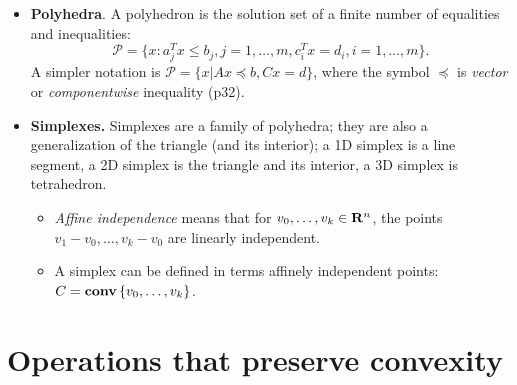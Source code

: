 \documentclass[a4paper, oneside]{book}
\begin{document}
\begin{itemize}
\item \textbf{Polyhedra}. A polyhedron is the solution set of a finite number of equalities and inequalities:
$$\mathcal P =\{ x : a_j^T x \le b_j, j=1, \hdots, m, c^T_i x= d_i, i=1,\hdots,m \}. $$
A simpler notation is $\mathcal P = \{x | Ax \preceq b, Cx = d \}$, where the symbol $\preceq$ is \textit{vector} or \textit{componentwise} inequality (p32).
\item \textbf{Simplexes.}  Simplexes are a family of polyhedra; they are also a generalization of the triangle (and its interior); \ie a 1D simplex is a line segment, a 2D simplex is the triangle and its interior, a 3D simplex is tetrahedron. 
	\begin{itemize}
	\item \textit{Affine independence} means that for $v_0, \hdots, v_k \in \mathbf R^n$, the points $v_1-v_0, \hdots, v_k-v_0$ are linearly independent.
	\item A simplex can be defined in terms affinely independent points: $C=\textbf{conv}\, \{v_0,\hdots,v_k\}$.
	\end{itemize}

\end{itemize}






\section{Operations that preserve convexity}
\end{document}
